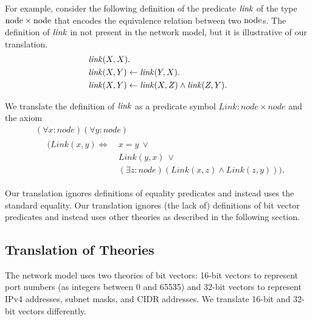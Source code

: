 
For example, consider the following definition of the predicate $\mathit{link}$ of the type $\mathrm{node} \times \mathrm{node}$ that encodes the equivalence relation between two $\mathrm{node}$s. The definition of $\mathit{link}$ in not present in the network model, but it is illustrative of our translation.
\begin{equation*}
\begin{aligned}
&\mathit{link}(X,X).\\
&\mathit{link}(X,Y)\leftarrow\mathit{link}(Y,X).\\
&\mathit{link}(X,Y)\leftarrow\mathit{link}(X,Z)\wedge\mathit{link}(Z,Y).
\end{aligned}
\end{equation*}

We translate the definition of $\mathit{link}$ as a predicate symbol $\mathit{Link}: \mathit{node} \times \mathit{node}$ and the axiom
\begin{equation*}
\begin{aligned}
&(\forall x:\mathit{node})(\forall y:\mathit{node})\\
&\quad
 \begin{aligned}
  (\mathit{Link}(x,y)\Leftrightarrow\:&x=y\:\vee\:\\
                                      &Link(y,x)\:\vee\:\\
                                      &(\exists z:\mathit{node})(\mathit{Link}(x,z)\wedge\mathit{Link}(z,y))).
 \end{aligned}
\end{aligned}
\end{equation*}

Our translation ignores definitions of equality predicates and instead uses the standard equality. Our translation ignores (the lack of) definitions of bit vector predicates and instead uses other theories as described in the following section.

\subsection{Translation of Theories}
\label{sect:aws/fol/theories}
The network model uses two theories of bit vectors: 16-bit vectors to represent port numbers (as integers between 0 and 65535) and 32-bit vectors to represent IPv4 addresses, subnet masks, and CIDR addresses. %
We translate 16-bit and 32-bit vectors differently.

